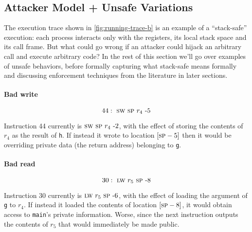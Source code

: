 \documentclass[acmsmall,review,anonymous]{acmart}\settopmatter{printfolios=true,printccs=false,printacmref=false}
\begin{document}

\subsection{Attacker Model + Unsafe Variations}


 The execution trace
shown in \cref{fig:running-trace-b} is an example of a
``stack-safe'' execution: each process interacts only with the
registers, its local stack space and its call frame. But what could go
wrong if an attacker could hijack an arbitrary call and execute
arbitrary code? In the rest of this section we'll go over examples of
unsafe behaviors, before formally capturing what stack-safe means
formally and discussing enforcement techniques from the literature
in later sections.



\paragraph*{Bad write}

\[
44 : ~ \textsc{sw} ~ \textsc{sp} ~ r_4 ~ \textrm{-} 5
\]

Instruction 44 currently is $\textsc{sw} ~ \textsc{sp} ~ r_4 ~ \textrm{-} 2$, with the
effect of storing the contents of $r_4$ as the result of {\tt h}. If
instead it wrote to location $[\textsc{sp} - 5]$ then it would be overriding
private data (the return address) belonging to {\tt g}.

\paragraph*{Bad read}

\[
30 : ~ \textsc{lw} ~ r_5 ~ \textsc{sp} ~ \textrm{-} 8
\]

Instruction 30 currently is $\textsc{lw} ~ r_5 ~ \textsc{sp} ~ \textrm{-} 6$, with the
effect of loading the argument of {\tt g} to $r_4$. If instead it
loaded the contents of location $[\textsc{sp} - 8]$, it would obtain access
to {\tt main}'s private information. Worse, since the next instruction
outputs the contents of $r_5$ that would immediately be made public.
\end{document}
